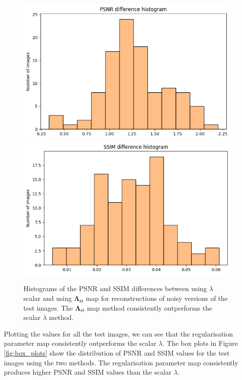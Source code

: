 \documentclass[12pt]{article}
\begin{document}
\begin{figure}[H]
  \centering
  \includegraphics[width=0.48\linewidth]{images//chest_xray/hist_psnr_diff.png}
  \includegraphics[width=0.48\linewidth]{images//chest_xray/hist_ssim_diff.png}
  \caption{Histograms of the PSNR and SSIM differences between using $\lambda$ scalar and using $\mathbf{\Lambda}_{\Theta}$ map for
  reconstructions of noisy versions of the test images. 
  The $\mathbf{\Lambda}_{\Theta}$ map method consistently outperforms the scalar $\lambda$ method.
  }
  \label{fig:hist_diff}
\end{figure}

Plotting the values for all the test images, we can see that the regularisation parameter map consistently outperforms the scalar $\lambda$.
The box plots in Figure \ref{fig:box_plots} show the distribution of PSNR and SSIM values for the test images
using the two methods.
The regularisation parameter map consistently produces higher PSNR and SSIM values than the scalar $\lambda$.






\end{document}
